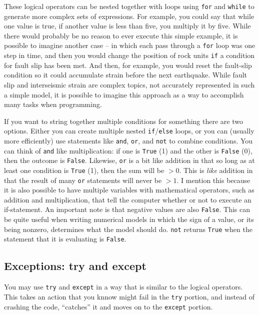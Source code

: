 \documentclass[a4paper,10pt]{scrartcl}
\begin{document}
These logical operators can be nested together with loops using \lstinline{for} and \lstinline{while} to generate more complex sets of expressions. For example, you could say that while one value is true, if another value is less than five, you multiply it by five. While there would probably be no reason to ever execute this simple example, it is possible to imagine another case -- in which each pass through a \lstinline{for} loop was one step in time, and then you would change the position of rock units \lstinline{if} a condition for fault slip has been met. And then, for example, you would reset the fault-slip condition so it could accumulate strain before the next earthquake. While fault slip and interseismic strain are complex topics, not accurately represented in such a simple model, it is possible to imagine this approach as a way to accomplish many tasks when programming.

If you want to string together multiple conditions for something there are two options. Either you can create multiple nested \lstinline{if}/\lstinline{else} loops, or you can (usually more efficiently) use statements like \lstinline{and}, \lstinline{or}, and \lstinline{not} to combine conditions. You can think of \lstinline{and} like multiplication: if one is \lstinline{True} (1) and the other is \lstinline{False} (0), then the outcome is \lstinline{False}. Likewise, \lstinline{or} is a bit like addition in that so long as at least one condition is \lstinline{True} (1), then the sum will be $>0$. This is \emph{like} addition in that the result of many \lstinline{or} statements will never be $>1$. I mention this because it is also possible to have multiple variables with mathematical operators, such as addition and multiplication, that tell the computer whether or not to execute an if-statement. An important note is that negative values are also \lstinline{False}. This can be quite useful when writing numerical models in which the sign of a value, or its being nonzero, determines what the model should do. \lstinline{not} returns \lstinline{True} when the statement that it is evaluating is \lstinline{False}.

\subsection{Exceptions: try and except}

You may use \lstinline{try} and \lstinline{except} in a way that is similar to the logical operators. This takes an action that you knnow might fail in the \lstinline{try} portion, and instead of crashing the code, ``catches'' it and moves on to the \lstinline{except} portion.
\end{document}

